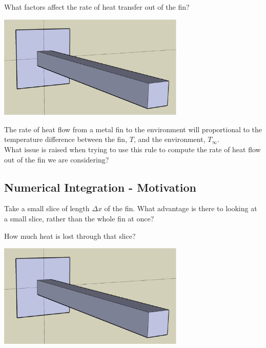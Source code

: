 \newpage
\vsc
\problem What factors affect the rate of heat transfer out of the
  fin?

\begin{center}
\includegraphics[width=3.5in]{graphics/notes_06_LongPin3D}
\end{center}

\vfill
\vfill

\newpage

The rate of heat flow from a metal fin to the environment will
proportional to the temperature difference between the fin, $T$, and
the environment, $T_\infty$. \\

\problem What issue is raised when trying to use this rule to compute
the rate of heat flow out of the fin we are considering?
 

\newpage
{}
\subsection*{Numerical Integration - Motivation}

\problem Take a small slice of length $\Delta x$ of the fin.  What
advantage is there to looking at a small slice, rather than the whole
fin at once?
\vfill

How much heat is lost through that slice?
\begin{center}
\includegraphics[width=3.5in]{graphics/notes_06_LongPin3D}
\end{center}

